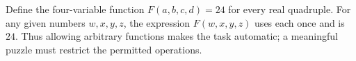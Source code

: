 Define the four-variable function $F(a,b,c,d)=24$ for every real quadruple. For any given numbers $w,x,y,z$, the expression $F(w,x,y,z)$ uses each once and is $\boxed{24}$. Thus allowing arbitrary functions makes the task automatic; a meaningful puzzle must restrict the permitted operations.
